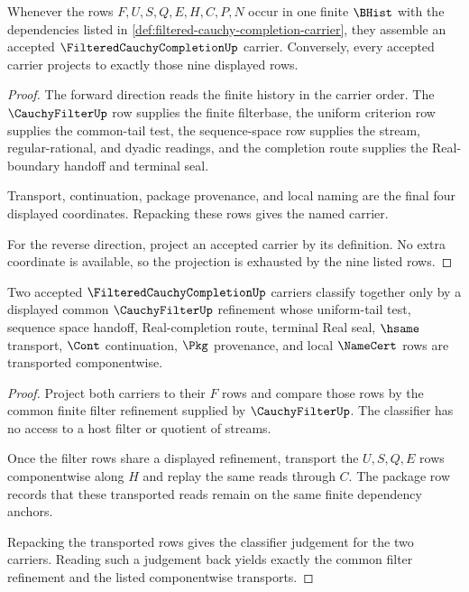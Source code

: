 \begin{theorem}\label{thm:filtered-cauchy-completion-carrier-habitation}
Whenever the rows $F,U,S,Q,E,H,C,P,N$ occur in one finite $\BHist$ with the
dependencies listed in \autoref{def:filtered-cauchy-completion-carrier}, they
assemble an accepted $\FilteredCauchyCompletionUp$ carrier. Conversely, every
accepted carrier projects to exactly those nine displayed rows.
\end{theorem}
\begin{proof}
The forward direction reads the finite history in the carrier order. The
$\CauchyFilterUp$ row supplies the finite filterbase, the uniform criterion
row supplies the common-tail test, the sequence-space row supplies the stream,
regular-rational, and dyadic readings, and the completion route supplies the
Real-boundary handoff and terminal seal.

Transport, continuation, package provenance, and local naming are the final
four displayed coordinates. Repacking these rows gives the named carrier.

For the reverse direction, project an accepted carrier by its definition. No
extra coordinate is available, so the projection is exhausted by the nine
listed rows.
\end{proof}

\begin{theorem}\label{thm:filtered-cauchy-completion-common-filter-transport}
Two accepted $\FilteredCauchyCompletionUp$ carriers classify together only by a
displayed common $\CauchyFilterUp$ refinement whose uniform-tail test, sequence
space handoff, Real-completion route, terminal Real seal, $\hsame$ transport,
$\Cont$ continuation, $\Pkg$ provenance, and local $\NameCert$ rows are
transported componentwise.
\end{theorem}
\begin{proof}
Project both carriers to their $F$ rows and compare those rows by the common
finite filter refinement supplied by $\CauchyFilterUp$. The classifier has no
access to a host filter or quotient of streams.

Once the filter rows share a displayed refinement, transport the $U,S,Q,E$
rows componentwise along $H$ and replay the same reads through $C$. The package
row records that these transported reads remain on the same finite dependency
anchors.

Repacking the transported rows gives the classifier judgement for the two
carriers. Reading such a judgement back yields exactly the common filter
refinement and the listed componentwise transports.
\end{proof}

